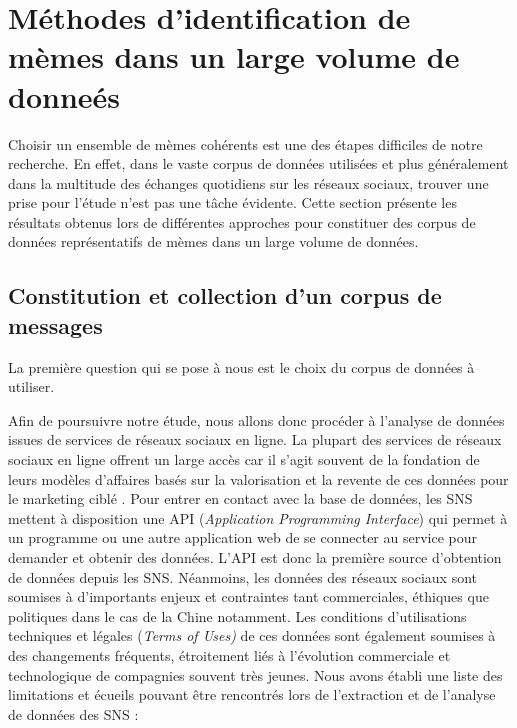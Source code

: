 \section{Méthodes d'identification de mèmes dans un large volume de donneés}

Choisir un ensemble de mèmes cohérents est une des étapes difficiles de notre recherche. En effet, dans le vaste corpus de données utilisées et plus généralement dans la multitude des échanges quotidiens sur les réseaux sociaux, trouver une prise pour l{\textquoteright}étude n{\textquoteright}est pas une t\^ache évidente. Cette section présente les résultats obtenus lors de différentes approches pour constituer des corpus de données représentatifs de mèmes dans un large volume de données.

\subsection[Constitution et collection d{\textquoteright}un corpus de messages]{Constitution et collection d{\textquoteright}un corpus de messages}
\label{sec:weiboscope}
La première question qui se pose à nous est le choix du corpus de données à utiliser.

Afin de poursuivre notre étude, nous allons donc procéder à l{\textquoteright}analyse de données issues de services de réseaux sociaux en ligne. La plupart des services de réseaux sociaux en ligne offrent un large accès car il s{\textquoteright}agit souvent de la fondation de leurs modèles d{\textquoteright}affaires basés sur la valorisation et la revente de ces données pour le marketing ciblé \citep{Ko2010}. Pour entrer en contact avec la base de données, les SNS mettent à disposition une API (\textit{Application Programming Interface}) qui permet à un programme ou une autre application web de se connecter au service pour demander et obtenir des données. L{\textquoteright}API est donc la première source d{\textquoteright}obtention de données depuis les SNS. Néanmoins, les données des réseaux sociaux sont soumises à d{\textquoteright}importants enjeux et contraintes tant commerciales, éthiques que politiques dans le cas de la Chine notamment. Les conditions d{\textquoteright}utilisations techniques et légales (\textit{Terms of Uses) }de ces données sont également soumises à des changements fréquents, étroitement liés à l{\textquoteright}évolution commerciale et technologique de compagnies souvent très jeunes. Nous avons établi une liste des limitations et écueils pouvant \^etre rencontrés lors de l{\textquoteright}extraction et de l{\textquoteright}analyse de données des SNS :

